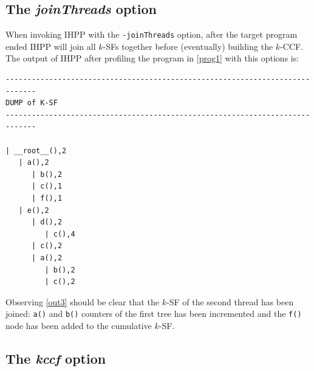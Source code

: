 \documentclass[a4paper,10pt]{report}
\begin{document}
\subsection{The \emph{joinThreads} option}

When invoking IHPP with the \verb|-joinThreads| option, after the target program ended
IHPP will join all $k$-SFs together before (eventually) building the $k$-CCF.
The output of IHPP after profiling the program in \cref{prog1} with this options is:

\begin{lstlisting}[label=out3, frame=bottomline, 
caption={the output of IHPP with the joinThreads option}]
-----------------------------------------------------------------------------
DUMP of K-SF
-----------------------------------------------------------------------------

| __root__(),2
   | a(),2
      | b(),2
      | c(),1
      | f(),1
   | e(),2
      | d(),2
         | c(),4
      | c(),2
      | a(),2
         | b(),2
         | c(),2
\end{lstlisting}
\noindent
Observing \cref{out3} should be clear that the $k$-SF of the second thread has been joined:
\verb|a()| and \verb|b()| counters of the first tree has been incremented and the \verb|f()| node has been added to the cumulative $k$-SF.

\subsection{The \emph{kccf} option}
\end{document}
